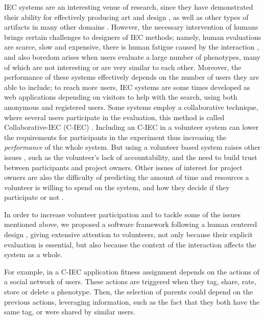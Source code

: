 IEC systems are an interesting venue of research, since they have demonstrated 
their ability for effectively 
producing art and design \cite{Bentley:1999:intro,Sims:1991,todd:1992,evoeco},
as well as other types of artifacts in many other domains \cite{ie1}. 
However, the necessary intervention of humans brings certain challenges 
to designers of IEC methods; namely, human evaluations are scarce, slow and expensive, there is
human fatigue caused by the interaction \cite{ie1}, and also boredom arises
when users evaluate a large number of phenotypes, 
many of which are not interesting or are very similar to each other.
Moreover, the performance of these systems effectively depends on the number of users
they are able to include; to reach more users,
IEC systems are some times developed as web applications depending on visitors to help
with the search, using both anonymous and registered users. Some systems 
employ a collaborative technique, where several users participate in 
the evaluation, this method is called Collaborative-IEC (C-IEC)
\cite{picbreeder,seyama2016development,wagy2014collective}.
Including an C-IEC in a volunteer system can lower the requirements for
participants in the experiment thus increasing the {\em performance} of the whole system. But using a volunteer based 
system raises other issues \cite{sarmenta2001volunteer,web:BOINC}, such as the 
volunteer's lack of accountability, and the need to build trust between participants and project
owners. Other issues of interest for project owners are also the difficulty of predicting 
the amount of time and resources a volunteer is willing to spend on the system, 
and how they decide if they participate or not \cite{JJ:2016}. 

In order to increase volunteer participation and to tackle some of the issues mentioned above,  
we proposed a software framework following a human centered design \cite{greenhouse2012human},
giving extensive attention to volunteers, not only because their
explicit evaluation is essential, but also because the context of the 
interaction affects the system as a whole.

For example, in a C-IEC application fitness assignment depends on the
actions of a social network of users.  These actions are triggered when 
they tag, share, rate, store or delete a phenotype. 
Then, the selection of parents could depend on the previous actions, leveraging information, 
such as the fact that they both have the same tag, or were shared by
similar users.

